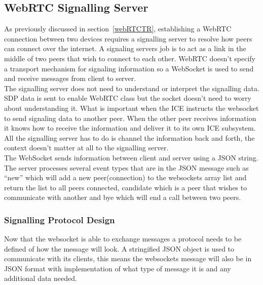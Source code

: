 \subsection{WebRTC Signalling Server}
As previously discussed in section~\ref{webRTCTR},  establishing a WebRTC connection between two devices requires a signalling server to resolve how peers can connect over the internet. A signaling servers job is to act as a link in the middle of two peers that wish to connect to each other. WebRTC doesn't specify a transport mechanism for signaling information so a WebSocket is used to send and receive messages from client to server.
\\ The signalling server does not need to understand or interpret the signalling data. SDP data is sent to enable WebRTC class but the socket doesn't need to worry about understanding it. What is important when the ICE instructs the websocket to send signaling data to another peer. When the other peer receives information  it knows how to receive the information and deliver it to its own ICE subsystem. All the signalling server has to do is channel the information back and forth, the context doesn't matter at all to the signalling server.
\\ The WebSocket sends information between client and server using a JSON string. The server processes several event types that are in the JSON message such  as “new” which will add a new peer(connection) to the websockets array list and return the list to all peers connected, candidate which is a peer that wishes to communicate with another and bye which will end a call between two peers.

\subsubsection{Signalling Protocol Design}
Now that the websocket is able to exchange messages a protocol needs to be defined of how the message will look. A stringified JSON object is used to communicate with its clients, this means the websockets message will also be in JSON format with implementation of what type of message it is and any additional data needed.

